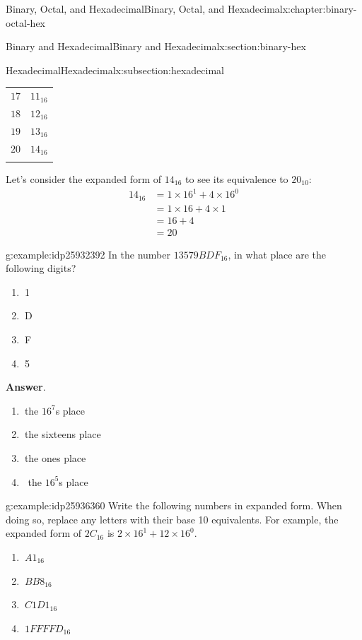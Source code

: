 \documentclass[twoside,10pt,]{book}
\newcommand{\blocktitlefont}{\relax}
\numberwithin{equation}{section}
\newcommand{\hrulethick} {\noalign{\hrule height 0.11em}}
\newcommand{\amp}{&}
\begin{document}
\begin{chapterptx}{Binary, Octal, and Hexadecimal}{}{Binary, Octal, and Hexadecimal}{}{}{x:chapter:binary-octal-hex}
\begin{sectionptx}{Binary and Hexadecimal}{}{Binary and Hexadecimal}{}{}{x:section:binary-hex}
\begin{subsectionptx}{Hexadecimal}{}{Hexadecimal}{}{}{x:subsection:hexadecimal}
\begin{sidebyside}{2}{0.2}{0.2}{0.2}
\begin{sbspanel}{0.2}
{{{\begin{tabular}{cc}
\(17\)&\(11_{16}\)\tabularnewline[0pt]
\(18\)&\(12_{16}\)\tabularnewline[0pt]
\(19\)&\(13_{16}\)\tabularnewline[0pt]
\(20\)&\(14_{16}\)\tabularnewline\hrulethick
\end{tabular}
}%
\par}
}%
\end{sbspanel}%
\end{sidebyside}%
%
\par
Let's consider the expanded form of \(14_{16}\) to see its equivalence to \(20_{10}\): %
\begin{align*}
14_{16} \amp = 1\times16^1+4\times16^0\\
\amp = 1\times 16+4\times 1\\
\amp = 16+4\\
\amp = 20
\end{align*}
%
\begin{example}{}{g:example:idp25932392}%
In the number \(13579BDF_{16}\),  in what place are the following digits? %
\begin{enumerate}
\item{}\(\ \)1%
\item{}\(\ \)D%
\item{}\(\ \)F%
\item{}\(\ \)5%
\end{enumerate}
\par\smallskip%
\noindent\textbf{\blocktitlefont Answer}.\label{g:answer:idp25930600}{}\hypertarget{g:answer:idp25930600}{}\quad{}%
\begin{enumerate}
\item{}\(\ \)the \(16^7\)s place%
\item{}\(\ \)the sixteens place%
\item{}\(\ \)the ones place%
\item{}\(\ \) the \(16^5\)s place%
\end{enumerate}
%
\end{example}
\begin{example}{}{g:example:idp25936360}%
Write the following numbers in expanded form.  When doing so, replace any letters with their base 10 equivalents.  For example, the expanded form of \(2C_{16}\) is \(2\times16^1+12\times16^0\). %
\begin{enumerate}
\item{}\(\displaystyle \ A1_{16}\)%
\item{}\(\displaystyle \ BB8_{16}\)%
\item{}\(\displaystyle \ C1D1_{16}\)%
\item{}\(\displaystyle \ 1FFFFD_{16}\)%

\end{enumerate}
\end{example}
\end{subsectionptx}
\end{sectionptx}
\end{chapterptx}
\end{document}

